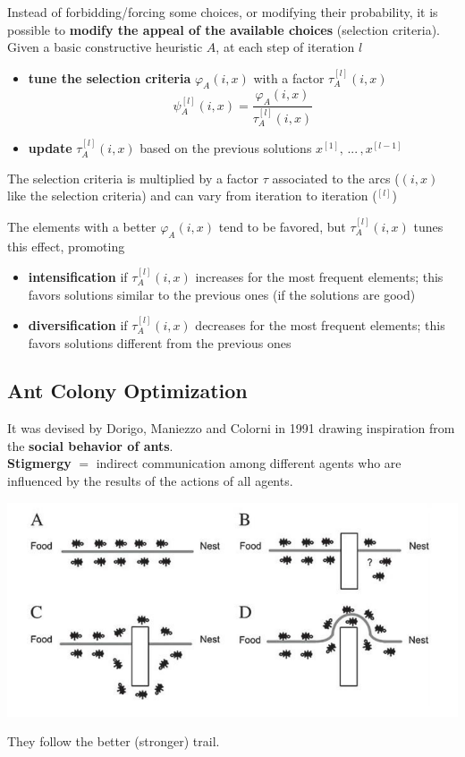 Instead of forbidding/forcing some choices, or modifying their probability, it is possible to \textbf{modify the appeal of the available choices} (selection criteria).\\

Given a basic constructive heuristic $A$, at each step of iteration $l$
\begin{itemize}
	\item \textbf{tune the selection criteria} $\varphi_A (i, x)$ with a factor $\tau_A^{[l]} (i, x)$
	$$ \psi_A^{[l]} (i,x) = \frac{\varphi_A (i,x)}{\tau_A^{[l]} (i, x)} $$
	
	\item \textbf{update} $\tau_A^{[l]} (i, x)$ based on the previous solutions $x^{[1]}, \, ... \, , x^{[l−1]}$
\end{itemize}
The selection criteria is multiplied by a factor $\tau$ associated to the arcs ($(i,x)$ like the selection criteria) and can vary from iteration to iteration ($^{[l]}$)

The elements with a better $\varphi_A (i, x)$ tend to be favored, but $\tau_A^{[l]} (i, x)$ tunes this effect, promoting
\begin{itemize}
	\item \textbf{intensification} if $\tau_A^{[l]} (i, x)$ increases for the most frequent elements; this favors solutions similar to the previous ones (if the solutions are good)
	
	\item \textbf{diversification} if $\tau_A^{[l]} (i, x)$ decreases for the most frequent elements; this favors solutions different from the previous ones
\end{itemize}

\newpage

\subsection{Ant Colony Optimization}

It was devised by Dorigo, Maniezzo and Colorni in 1991 drawing inspiration from the \textbf{social behavior of ants}.\\

\textbf{Stigmergy} $=$ indirect communication among different agents who are influenced by the results of the actions of all agents.

\begin{center}
	\includegraphics[width=0.7\columnwidth]{img/ants}
\end{center}
They follow the better (stronger) trail.\\

